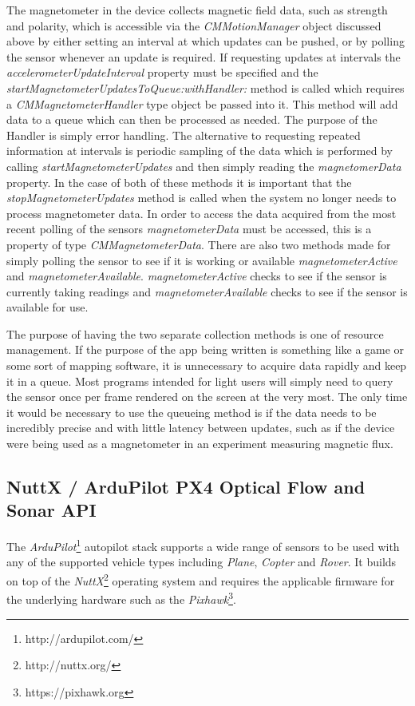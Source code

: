 \documentclass[paper=letter, fontsize=11pt]{scrartcl}
\numberwithin{equation}{section}
\numberwithin{figure}{section}
\numberwithin{table}{section}
\begin{document}
\par
The magnetometer in the device collects magnetic field data, such as strength
and polarity, which is accessible via the {\em CMMotionManager} object discussed
above by either setting an interval at which updates can be pushed, or by
polling the sensor whenever an update is required. If requesting updates at
intervals the {\em accelerometerUpdateInterval} property must be specified and
the {\em startMagnetometerUpdatesToQueue:withHandler:} method is called which
requires a {\em CMMagnetometerHandler} type object be passed into it. This
method will add data to a queue which can then be processed as needed. The
purpose of the Handler is simply error handling. The alternative to requesting
repeated information at intervals is periodic sampling of the data which is
performed by calling {\em startMagnetometerUpdates} and then simply reading the
{\em magnetomerData} property. In the case of both of these methods it is
important that the {\em stopMagnetometerUpdates} method is called when the
system no longer needs to process magnetometer data. In order to access the 
data acquired from the most recent polling of the sensors {\em
magnetometerData} must be accessed, this is a property of type
{\em CMMagnetometerData}. There are also two methods made for simply polling the
sensor to see if it is working or available {\em magnetometerActive} and {\em
magnetometerAvailable}. {\em magnetometerActive} checks to see if the sensor is
currently taking readings and {\em magnetometerAvailable} checks to see if the
sensor is available for use.

\par
The purpose of having the two separate collection methods is one of resource
management. If the purpose of the app being written is something like a game or
some sort of mapping software, it is unnecessary to acquire data rapidly and
keep it in a queue. Most programs intended for light users will simply need to
query the sensor once per frame rendered on the screen at the very most. The
only time it would be necessary to use the queueing method is if the data needs to be incredibly
precise and with little latency between updates, such as if the device were
being used as a magnetometer in an experiment measuring magnetic flux.

\subsection{NuttX / ArduPilot PX4 Optical Flow and Sonar API}
\label{ardupilot_flow_api}
\par
The {\em ArduPilot}\footnote{http://ardupilot.com/} autopilot stack supports a
wide range of sensors to be used with any of the supported vehicle types
including {\em Plane}, {\em Copter} and {\em Rover}. It builds on top of the
{\em NuttX}\footnote{http://nuttx.org/} operating system and requires the
applicable firmware for the underlying hardware such as the
{\em Pixhawk}\footnote{https://pixhawk.org}.
\end{document}
